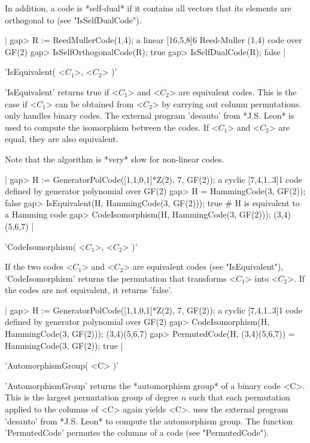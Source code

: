 In addition, a  code is *self-dual* if it  contains all vectors that  its
elements are orthogonal to (see "IsSelfDualCode").

|    gap> R := ReedMullerCode(1,4);
    a linear [16,5,8]6 Reed-Muller (1,4) code over GF(2)
    gap> IsSelfOrthogonalCode(R);
    true
    gap> IsSelfDualCode(R);
    false |


'IsEquivalent( <$C_1$>, <$C_2$> )'

'IsEquivalent' returns   true  if <$C_1$> and   <$C_2$>  are equi\-valent
codes.  This is the  case  if <$C_1$> can  be  obtained from <$C_2$>   by
carrying out column permutations. {\GUAVA} only handles binary codes. The
external  program  'desauto' from  *J.S.  Leon* is   used  to compute the
isomorphism between  the codes.  If  <$C_1$> and <$C_2$>  are equal, they
are also equivalent.

Note that the algorithm is *very* slow for non-linear codes.

|    gap> H := GeneratorPolCode([1,1,0,1]*Z(2), 7, GF(2));
    a cyclic [7,4,1..3]1 code defined by generator polynomial over GF(2)
    gap> H = HammingCode(3, GF(2));
    false
    gap> IsEquivalent(H, HammingCode(3, GF(2)));
    true                        # H is equivalent to a Hamming code
    gap> CodeIsomorphism(H, HammingCode(3, GF(2)));
    (3,4)(5,6,7) |


'CodeIsomorphism( <$C_1$>, <$C_2$> )'

If the  two   codes <$C_1$>   and <$C_2$>   are  equivalent  codes   (see
"IsEquivalent"), 'CodeIsomorphism'    returns   the permutation      that
transforms  <$C_1$> into <$C_2$>.  If the  codes  are not equivalent,  it
returns 'false'.

|    gap> H := GeneratorPolCode([1,1,0,1]*Z(2), 7, GF(2));
    a cyclic [7,4,1..3]1 code defined by generator polynomial over GF(2)
    gap> CodeIsomorphism(H, HammingCode(3, GF(2)));
    (3,4)(5,6,7)
    gap> PermutedCode(H, (3,4)(5,6,7)) = HammingCode(3, GF(2));
    true |


'AutomorphismGroup( <C> )'

'AutomorphismGroup' returns the  *automorphism group*  of a binary   code
<C>. This is the largest  permutation group of degree  $n$ such that each
permutation applied to the columns of <C> again yields <C>. {\GUAVA} uses
the   external   program 'desauto'   from *J.S.   Leon*  to   compute the
automorphism group. The function 'PermutedCode' permutes the columns of a
code (see "PermutedCode").

